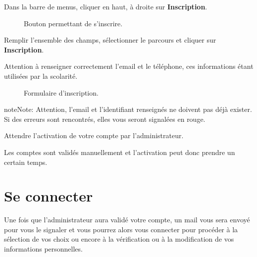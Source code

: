 \documentclass[letterpaper,10pt,french]{sphinxmanual}
\begin{document}
Dans la barre de menus, cliquer en haut, à droite sur \textbf{Inscription}.
\begin{figure}[htbp]
\centering
\capstart

\caption{Bouton permettant de s'inscrire.}\end{figure}

Remplir l'ensemble des champs, sélectionner le parcours et cliquer sur \textbf{Inscription}.

Attention à renseigner correctement l'email et le téléphone, ces informations étant utilisées par la scolarité.
\begin{figure}[htbp]
\centering
\capstart

\caption{Formulaire d'inscription.}\end{figure}

\begin{notice}{note}{Note:}
Attention, l'email et l'identifiant renseignés ne doivent pas déjà exister.
Si des erreurs sont rencontrés, elles vous seront signalées en rouge.
\end{notice}

Attendre l'activation de votre compte par l'administrateur.

Les comptes sont validés manuellement et l'activation peut donc prendre un certain temps.


\section{Se connecter}
\label{etudiant:se-connecter}
Une fois que l’administrateur aura validé votre compte, un mail vous sera envoyé pour vous le signaler et vous pourrez alors vous connecter pour procéder à la sélection de vos choix ou encore à la vérification ou à la modification de vos informations personnelles.
\end{document}
